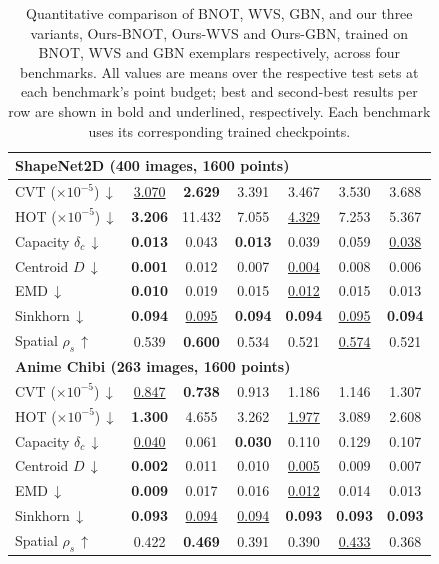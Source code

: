\begin{table}[t]
\begin{tabular}{|l|c|c|c|c|c|c|}
\hline
\multicolumn{7}{|l|}{\textbf{ShapeNet2D (400 images, 1600 points)}} \\
\hline
CVT ($\times 10^{-5}$)\,$\downarrow$ & \underline{3.070} & \textbf{2.629} & 3.391 & 3.467 & 3.530 & 3.688 \\
HOT ($\times 10^{-5}$)\,$\downarrow$ & \textbf{3.206} & 11.432 & 7.055 & \underline{4.329} & 7.253 & 5.367 \\
Capacity $\delta_c$\,$\downarrow$ & \textbf{0.013} & 0.043 & \textbf{0.013} & 0.039 & 0.059 & \underline{0.038} \\
Centroid $D$\,$\downarrow$ & \textbf{0.001} & 0.012 & 0.007 & \underline{0.004} & 0.008 & 0.006 \\
EMD\,$\downarrow$ & \textbf{0.010} & 0.019 & 0.015 & \underline{0.012} & 0.015 & 0.013 \\
Sinkhorn\,$\downarrow$ & \textbf{0.094} & \underline{0.095} & \textbf{0.094} & \textbf{0.094} & \underline{0.095} & \textbf{0.094} \\
Spatial $\rho_s$\,$\uparrow$ & 0.539 & \textbf{0.600} & 0.534 & 0.521 & \underline{0.574} & 0.521 \\
\hline
\multicolumn{7}{|l|}{\textbf{Anime Chibi (263 images, 1600 points)}} \\
\hline
CVT ($\times 10^{-5}$)\,$\downarrow$ & \underline{0.847} & \textbf{0.738} & 0.913 & 1.186 & 1.146 & 1.307 \\
HOT ($\times 10^{-5}$)\,$\downarrow$ & \textbf{1.300} & 4.655 & 3.262 & \underline{1.977} & 3.089 & 2.608 \\
Capacity $\delta_c$\,$\downarrow$ & \underline{0.040} & 0.061 & \textbf{0.030} & 0.110 & 0.129 & 0.107 \\
Centroid $D$\,$\downarrow$ & \textbf{0.002} & 0.011 & 0.010 & \underline{0.005} & 0.009 & 0.007 \\
EMD\,$\downarrow$ & \textbf{0.009} & 0.017 & 0.016 & \underline{0.012} & 0.014 & 0.013 \\
Sinkhorn\,$\downarrow$ & \textbf{0.093} & \underline{0.094} & \underline{0.094} & \textbf{0.093} & \textbf{0.093} & \textbf{0.093} \\
Spatial $\rho_s$\,$\uparrow$ & 0.422 & \textbf{0.469} & 0.391 & 0.390 & \underline{0.433} & 0.368 \\
\hline
\end{tabular}
\caption{Quantitative comparison of BNOT, WVS, GBN, and our three variants, Ours-BNOT, Ours-WVS and Ours-GBN, trained on BNOT, WVS and GBN exemplars respectively, across four benchmarks. All values are means over the respective test sets at each benchmark's point budget; best and second-best results per row are shown in bold and underlined, respectively. Each benchmark uses its corresponding trained checkpoints.}
\label{tab:quantitative_comparison}
\end{table}